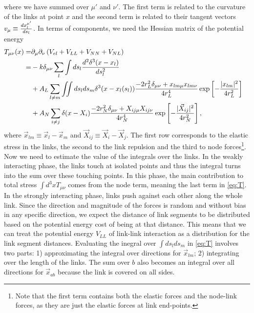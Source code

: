 \documentclass[endfloats,nofootinbib,preprint,floatfix,titlepage,superscriptaddress]{revtex4} %
\begin{document}
where we have summed over $\mu'$ and $\nu'$. 
The first term is related to the curvature of the links at point $x$ and the second term is related to their tangent vectors $v_\mu \equiv {d x_l^{\mu'}\over ds_l}$.  
In terms of components, we need the Hessian matrix of the potential energy
\begin{align}
    T_{\mu\nu}(x) =&  %
    \ro_\mu \ro_\nu \pr{V_{el}+V_{LL} + V_{NN}+V_{NL}} \cr
    =& %
    -{k}\delta_{\mu\nu} \sum_l\int ds_l {d^2 \delta^3(x-x_l)\over ds_l^2} \cr
    & + A_L \sum_{l\ne m} \iint ds_l ds_m \delta^3(x-x_l(s_l))\frac{-2r_L^2\delta_{\mu\nu}+ x_{lm\mu} x_{lm\nu}}{4r_L^4}
     \exp\left[- {|x_{lm}|^2 \over 4 r_L^2}\right]\cr
    &+ A_N\sum_{i\ne j}\delta(x-X_i)\frac{-2r_N^2\delta_{\mu\nu}+ X_{ij\mu}X_{ij\nu}}{4r_N^4}
    \exp\left[- {|\vec{X}_{ij}|^2 \over 4 r_N^2}\right],
    \label{eq:T}
\end{align}
where $\vec{x}_{lm} \equiv \vec{x}_l-\vec{x}_m$ and $\vec{X}_{ij} \equiv \vec{X}_i-\vec{X}_j$. The first row corresponds to the elastic stress in the links, the second to the link repulsion and the third to node forces\footnote{
Note that the first term contains both the elastic forces and the node-link forces, as they are just the elastic forces at link end-points.}. 
Now we need to estimate the value of the integrals over the links.
In the weakly interacting phase, the links touch at isolated points and thus the integral turns into the sum over these touching points. 
In this phase, the main contribution to total stress $\int d^3 x T_{\mu\nu}$ comes from the node term, meaning the last term in \eqref{eq:T}. 
In the strongly interacting phase, links push against each other along the whole link. 
Since the direction and magnitude of the forces is random and without bias in any specific direction, we expect the distance of link segments to be distributed based on the potential energy cost of being at that distance. 
This means that we can treat the potential energy $V_{LL}$ of link-link interaction as a distribution for the link segment distances. 
Evaluating the inegral over $\int ds_lds_m$ in \eqref{eq:T} involves two parts: 1) approximating the integral over directions for $\vec{x}_{lm}$; 2) integrating over the length of the links. 
The sum over $b$ also becomes an integral over all directions for $\vec{x}_{ab}$ because the link is covered on all sides. 
\end{document}
